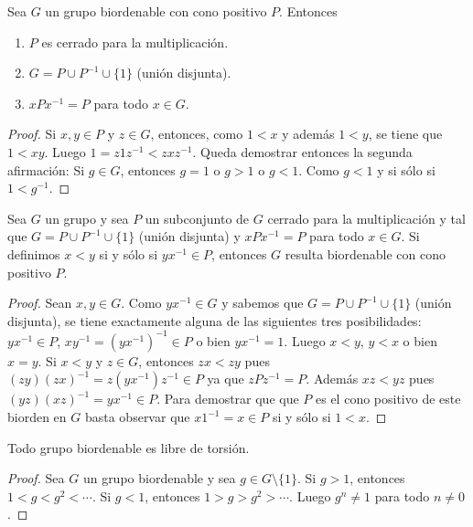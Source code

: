 \begin{lemma}
	\label{lemma:biordenableP1}
	Sea $G$ un grupo biordenable con cono positivo $P$. Entonces
	\begin{enumerate}
		\item $P$ es cerrado para la multiplicación.
		\item $G=P\cup P^{-1}\cup \{1\}$ (unión disjunta).
		\item $xPx^{-1}=P$ para todo $x\in G$.
	\end{enumerate}
\end{lemma}

\begin{proof}
	Si $x,y\in P$ y $z\in G$, entonces, como $1<x$ y además $1<y$, se tiene que
	$1<xy$.  Luego $1=z1z^{-1}<zxz^{-1}$. Queda demostrar entonces la segunda
	afirmación: Si $g\in G$, entonces $g=1$ o $g>1$ o $g<1$. Como $g<1$ y si
	sólo si $1<g^{-1}$. 
\end{proof}

\begin{lemma}
	\label{lem:biordenableP2}
	Sea $G$ un grupo y sea $P$ un subconjunto de $G$ cerrado para la
	multiplicación y tal que $G=P\cup P^{-1}\cup \{1\}$ (unión disjunta) y
	$xPx^{-1}=P$ para todo $x\in G$. Si definimos $x<y$ si y sólo si
	$yx^{-1}\in P$, entonces $G$ resulta biordenable con cono positivo $P$.
\end{lemma}

\begin{proof}
	Sean $x,y\in G$. Como $yx^{-1}\in G$ y sabemos que $G=P\cup
	P^{-1}\cup\{1\}$ (unión disjunta), se tiene exactamente alguna de las
	siguientes tres posibilidades: $yx^{-1}\in P$, $xy^{-1}=(yx^{-1})^{-1}\in
	P$ o bien $yx^{-1}=1$. Luego $x<y$, $y<x$ o bien $x=y$. Si $x<y$ y $z\in
	G$, entonces $zx<zy$ pues $(zy)(zx)^{-1}=z(yx^{-1})z^{-1}\in P$ ya que
	$zPz^{-1}=P$. Además $xz<yz$ pues $(yz)(xz)^{-1}=yx^{-1}\in P$. Para demostrar que 
	que $P$ es el cono positivo de este biorden en $G$ basta observar que
	$x1^{-1}=x\in P$ si y sólo si $1<x$. 
\end{proof}

\begin{proposition}
	\label{pro:BOsintorsion}
	Todo grupo biordenable es libre de torsión.
\end{proposition}

\begin{proof}
	Sea $G$ un grupo biordenable y sea $g\in G\setminus\{1\}$. 
	Si $g>1$, entonces 
	$1<g<g^2<\cdots$. Si $g<1$, entonces $1>g>g^2>\cdots$. Luego $g^n\ne 1$ para todo $n\ne 0$. 
\end{proof}

